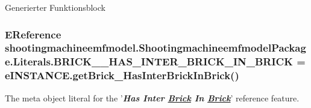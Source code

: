Generierter Funktionsblock \hypertarget{interfaceshootingmachineemfmodel_1_1_shootingmachineemfmodel_package_1_1_literals_a88a578651b01ca8d696df5e511b804c3}{
\subsubsection[{B\-R\-I\-C\-K\-\_\-\-\_\-\-H\-A\-S\-\_\-\-I\-N\-T\-E\-R\-\_\-\-B\-R\-I\-C\-K\-\_\-\-I\-N\-\_\-\-B\-R\-I\-C\-K}]{\setlength{\rightskip}{0pt plus 5cm}E\-Reference shootingmachineemfmodel.\-Shootingmachineemfmodel\-Package.\-Literals.\-B\-R\-I\-C\-K\-\_\-\-\_\-\-H\-A\-S\-\_\-\-I\-N\-T\-E\-R\-\_\-\-B\-R\-I\-C\-K\-\_\-\-I\-N\-\_\-\-B\-R\-I\-C\-K = e\-I\-N\-S\-T\-A\-N\-C\-E.\-get\-Brick\-\_\-\-Has\-Inter\-Brick\-In\-Brick()}}\label{interfaceshootingmachineemfmodel_1_1_shootingmachineemfmodel_package_1_1_literals_a88a578651b01ca8d696df5e511b804c3}
The meta object literal for the '{\itshape {\bfseries Has Inter \hyperlink{interfaceshootingmachineemfmodel_1_1_brick}{Brick} In \hyperlink{interfaceshootingmachineemfmodel_1_1_brick}{Brick}}}' reference feature.

